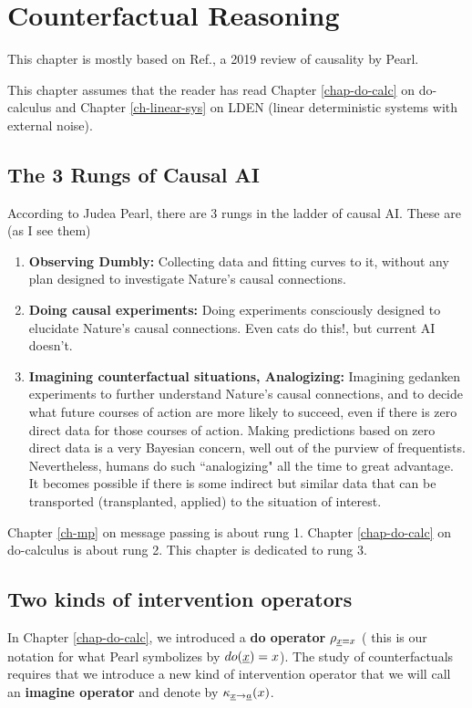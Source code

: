 \chapter{Counterfactual Reasoning}
\label{ch-counterf}
This chapter is mostly based on 
Ref.\cite{pearl-2019review}, a 2019
 review of causality by Pearl.

This chapter
assumes that the reader
has read
Chapter \ref{chap-do-calc}
on do-calculus and
Chapter \ref{ch-linear-sys}  
on LDEN (linear 
deterministic systems
with external noise).

\section*{The 3 Rungs of Causal AI}
According to 
Judea Pearl,
there are 3 rungs in the
ladder of causal AI.
These are (as I see them)
\begin{enumerate}
\item
{\bf Observing Dumbly:} Collecting 
data
and fitting curves to it,
without any plan 
designed to
investigate Nature's 
causal connections.
\item {\bf Doing causal
experiments:} 
Doing experiments 
consciously designed to
elucidate
Nature's causal connections.
Even cats do this!, but current AI doesn't.
\item {\bf Imagining
 counterfactual situations, Analogizing:}
Imagining gedanken experiments
to further understand
Nature's causal connections,
and to decide what future
courses of action are
more likely to succeed,
even if there is zero
direct data for 
those courses of action.
Making
predictions based
on zero direct data is a very Bayesian
concern, well out of the purview of 
frequentists. Nevertheless,
humans do such
``analogizing" 
all the time to great advantage.
It becomes
possible if there
is some indirect but similar
data that can be transported
(transplanted, applied)
to the situation of
interest.
\end{enumerate}
Chapter \ref{ch-mp}
on message passing
is about rung 1.
Chapter \ref{chap-do-calc}
on do-calculus is about rung 2.
This chapter is dedicated to rung 3.



\section*{Two kinds of
 intervention operators}
In Chapter \ref{chap-do-calc},
we introduced a {\bf do operator}
$\rho_{{\underline{x}}=x}$ (
this is our notation for what Pearl 
symbolizes by $do({\underline{x}})=x$).
The study of counterfactuals 
requires that we
introduce a new
kind of intervention
operator that we will
call an {\bf imagine operator}
and denote by $\kappa_{{\underline{x}}\rightarrow{\underline{a}}}(x)$.

